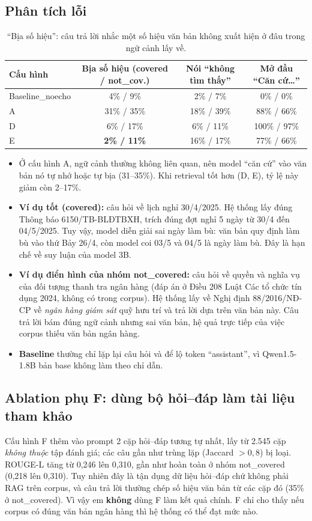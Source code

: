 \documentclass[11pt,a4paper]{article}
\newcommand{\best}[1]{\textbf{#1}}
\begin{document}
\subsection{Phân tích lỗi}
\begin{table}[H]
\centering\small
\caption{``Bịa số hiệu'': câu trả lời nhắc một số hiệu văn bản không xuất hiện ở đâu trong ngữ cảnh lấy về.}
\begin{tabular}{@{}lccc@{}}
\toprule
Cấu hình & Bịa số hiệu (covered / not\_cov.) & Nói ``không tìm thấy'' & Mở đầu ``Căn cứ\dots'' \\
\midrule
Baseline\_noecho & 4\% / 9\% & 2\% / 7\% & 0\% / 0\% \\
A & 31\% / 35\% & 18\% / 39\% & 88\% / 66\% \\
D & 6\% / 17\% & 6\% / 11\% & 100\% / 97\% \\
E & \best{2\% / 11\%} & 16\% / 17\% & 77\% / 66\% \\
\bottomrule
\end{tabular}
\end{table}

\begin{itemize}
  \item Ở cấu hình A, ngữ cảnh thường không liên quan, nên model ``căn cứ'' vào văn bản nó tự nhớ hoặc tự bịa (31--35\%).
        Khi retrieval tốt hơn (D, E), tỷ lệ này giảm còn 2--17\%.
  \item \textbf{Ví dụ tốt (covered):} câu hỏi về lịch nghỉ 30/4/2025. Hệ thống lấy đúng Thông báo 6150/TB-BLĐTBXH, trích đúng đợt nghỉ 5 ngày từ 30/4 đến 04/5/2025.
        Tuy vậy, model diễn giải sai ngày làm bù: văn bản quy định làm bù vào thứ Bảy 26/4, còn model coi 03/5 và 04/5 là ngày làm bù. Đây là hạn chế về suy luận của model 3B.
  \item \textbf{Ví dụ điển hình của nhóm not\_covered:} câu hỏi về quyền và nghĩa vụ của đối tượng thanh tra ngân hàng (đáp án ở Điều 208 Luật Các tổ chức tín dụng 2024, không có trong corpus).
        Hệ thống lấy về Nghị định 88/2016/NĐ-CP về \emph{ngân hàng giám sát} quỹ hưu trí và trả lời dựa trên văn bản này.
        Câu trả lời bám đúng ngữ cảnh nhưng sai văn bản, hệ quả trực tiếp của việc corpus thiếu văn bản ngân hàng.
  \item \textbf{Baseline} thường chỉ lặp lại câu hỏi và để lộ token ``assistant'', vì Qwen1.5-1.8B bản base không làm theo chỉ dẫn.
\end{itemize}

\subsection{Ablation phụ F: dùng bộ hỏi--đáp làm tài liệu tham khảo}
Cấu hình F thêm vào prompt 2 cặp hỏi--đáp tương tự nhất, lấy từ 2.545 cặp \emph{không thuộc} tập đánh giá; các câu gần như trùng lặp (Jaccard $>0{,}8$) bị loại.
ROUGE-L tăng từ 0{,}246 lên 0{,}310, gần như hoàn toàn ở nhóm not\_covered (0{,}218 lên 0{,}310).
Tuy nhiên đây là tận dụng dữ liệu hỏi--đáp chứ không phải RAG trên corpus, và câu trả lời thường chép số hiệu văn bản từ các cặp đó (35\% ở not\_covered).
Vì vậy em \textbf{không} dùng F làm kết quả chính. F chỉ cho thấy nếu corpus có đúng văn bản ngân hàng thì hệ thống có thể đạt mức nào.
\end{document}
